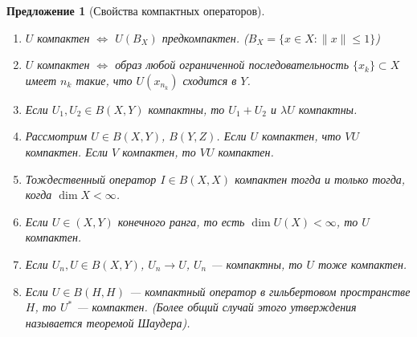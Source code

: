 \documentclass[11pt,openany,a4paper]{scrartcl}
\theoremstyle{plain}
\newtheorem{proposition}[theorem]{Предложение}
\theoremstyle{definition}
\begin{document}
\begin{proposition}[Свойства компактных операторов]
\mbox{}
    \begin{enumerate}
        \item $U$ компактен $\iff$ $U(B_X)$ предкомпактен.
        ($B_X = \{x \in X: \|x\| \leqslant 1\}$)
        \item $U$ компактен $\iff$ образ любой ограниченной последовательность
        $\{x_k\}\subset X$ имеет $n_k$ такие, что $U(x_{n_k})$ сходится в $Y$.
        \item Если $U_1, U_2 \in B(X, Y)$ компактны, то $U_1 + U_2$ и $\lambda U$ компактны.
        \item \label{compact_product}
        Рассмотрим $U \in B(X, Y)$, $B(Y, Z)$. Если $U$ компактен, что $VU$ компактен.
        Если $V$ компактен, то $VU$ компактен.
        \item Тождественный оператор $I \in B(X, X)$ компактен тогда и только тогда, 
        когда $\dim X < \infty$.
        \item Если $U \in (X, Y)$ конечного ранга, то есть $\dim U(X) < \infty$, то $U$
        компактен.
        \item Если $U_n, U \in B(X, Y)$, $U_n \to U$, $U_n$ — компактны, то $U$ тоже 
        компактен.
        \item Если $U \in B(H, H)$ — компактный оператор в гильбертовом пространстве $H$, то
        $U^\ast$ — компактен.
        (Более общий случай этого утверждения называется теоремой Шаудера).
    \end{enumerate}
\end{proposition}
\end{document}
